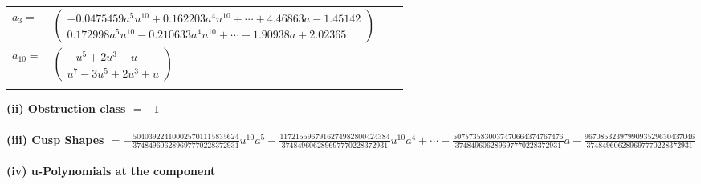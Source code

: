 \documentclass[1p]{elsarticle_modified}
\theoremstyle{definition}
\begin{document}
\begin{tabular}{m{7pt} m{180pt} m{7pt} m{180pt} }
\flushright $a_{3}=$&$\begin{pmatrix}-0.0475459 a^{5} u^{10}+0.162203 a^{4} u^{10}+\cdots+4.46863 a-1.45142\\0.172998 a^{5} u^{10}-0.210633 a^{4} u^{10}+\cdots-1.90938 a+2.02365\end{pmatrix}$ \\
\flushright $a_{10}=$&$\begin{pmatrix}- u^5+2 u^3- u\\u^7-3 u^5+2 u^3+u\end{pmatrix}$\\&\end{tabular}
\flushleft \textbf{(ii) Obstruction class $= -1$}\\~\\
\flushleft \textbf{(iii) Cusp Shapes $= -\frac{504039224100025701115835624}{374849606289697770228372931} u^{10} a^5-\frac{1172155967916274982800424384}{374849606289697770228372931} u^{10} a^4+\cdots-\frac{5075735830037470664374767476}{374849606289697770228372931} a+\frac{9670853239799093529630437046}{374849606289697770228372931}$}\\~\\
\newpage\renewcommand{\arraystretch}{1}
\flushleft \textbf{(iv) u-Polynomials at the component}\newline \\
\end{document}
